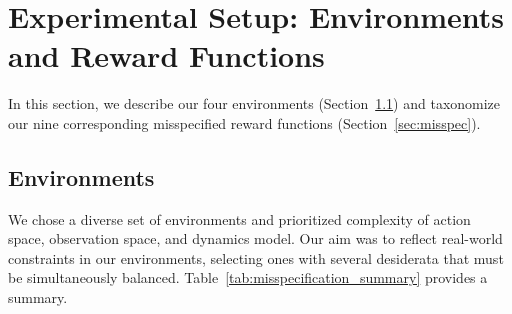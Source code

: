 \section{Experimental Setup: Environments and Reward Functions} \label{sec:setup}
In this section, we describe our four environments (Section~\ref{sec:environments}) and taxonomize our nine corresponding misspecified reward functions (Section~\ref{sec:misspec}).



\subsection{Environments}\label{sec:environments}
We chose a diverse set of environments and prioritized complexity of action space, observation space, and dynamics model. Our aim was to reflect real-world constraints in our environments, selecting ones with several desiderata that must be simultaneously balanced.  Table~\ref{tab:misspecification_summary} provides a summary. 






